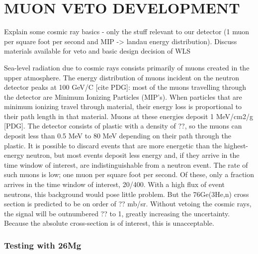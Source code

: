 %
%
%
%
%
%
%
%

%
%

\chapter{MUON VETO DEVELOPMENT}
\label{chap:muVeto}
Explain some cosmic ray basics - only the stuff relevant to our detector (1 muon per square foot per second and MIP -> landau energy distribution).
Discuss materials available for veto and basic design decision of WLS

Sea-level radiation due to cosmic rays consists primarily of muons created in the upper atmosphere.  The energy distribution of muons incident on the neutron detector peaks at 100 GeV/C [cite PDG]: most of the muons travelling through the detector are Minimum Ionizing Particles (MIP's).  When particles that are minimum ionizing travel through material, their energy loss is proportional to their path length in that material.  Muons at these energies deposit 1 MeV/cm2/g [PDG].  The detector consists of plastic with a density of ??, so the muons can deposit less than 0.5 MeV to 80 MeV depending on their path through the plastic.  It is possible to discard events that are more energetic than the highest-energy neutron, but most events deposit less energy and, if they arrive in the time window of interest, are indistinguishable from a neutron event.  The rate of such muons is low; one muon per square foot per second.  Of these, only a fraction arrives in the time window of interest, 20/400.  With a high flux of event neutrons, this background would pose little problem.  But the 76Ge(3He,n) cross section is predicted to be on order of ?? mb/sr.  Without vetoing the cosmic rays, the signal will be outnumbered ?? to 1, greatly increasing the uncertainty.  Because the absolute cross-section is of interest, this is unacceptable. 

\subsection{Testing with 26Mg}

